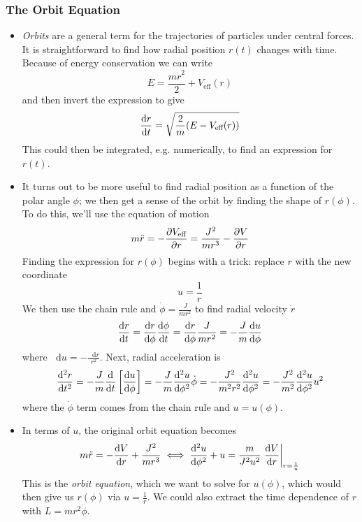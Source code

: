 \documentclass[11pt, a4paper]{article}
\newcommand{\diff}{\mathop{}\!\mathrm{d}} %
\newcommand{\veff}{V_{\text{eff}}}
\begin{document}
\subsubsection{The Orbit Equation}

\begin{itemize}
	\item \textit{Orbits} are a general term for the  trajectories of particles under central forces. It is straightforward to find how radial position $ r(t) $ changes with time. Because of energy conservation we can write
	\begin{equation*}
		E = \frac{m \dot{r}^{2}}{2} + \veff(r)
	\end{equation*}
	and then invert the expression to give
	\begin{equation*}
		\dv{r}{t} = \sqrt{\frac{2}{m}(E - \veff(r))}
	\end{equation*}
	This could then be integrated, e.g. numerically, to find an expression for $ r(t) $. 
	
	\item It turns out to be more useful to find radial position as a function of the polar angle $ \phi $; we then get a sense of the orbit by finding the shape of $ r(\phi) $. To do this, we'll use the equation of motion
	\begin{equation*}
		m \ddot{r} = -\pdv{\veff}{r} = \frac{J^{2}}{mr^{3}} - \pdv{V}{r}
	\end{equation*}
	Finding the expression for $ r(\phi) $ begins with a trick: replace $ r $ with the new coordinate
	\begin{equation*}
		u = \frac{1}{r}
	\end{equation*}
	We then use the chain rule and $ \dot{\phi} = \frac{J}{mr^{2}} $ to find radial velocity $ \dot{r} $
	\begin{equation*}
		\dv{r}{t} = \dv{r}{\phi} \dv{\phi}{t} =  \dv{r}{\phi}  \frac{J}{mr^{2}}  = - \frac{J}{m} \dv{u}{\phi}
	\end{equation*}
	where  $ \diff u = -\frac{\diff r}{r^{2}} $. Next, radial acceleration is
	\begin{equation*}
		\dv[2]{r}{t} = - \frac{J}{m} \dv{}{t}\left[\dv{u}{\phi}\right] = - \frac{J}{m} \dv[2]{u}{\phi} \dot{\phi} = -\frac{J^{2}}{m^{2}r^{2}} \dv[2]{u}{\phi} = -\frac{J^{2}}{m^{2}}\dv[2]{u}{\phi} u^{2}
	\end{equation*}
	where the $ \dot{\phi} $ term comes from the chain rule and $ u = u(\phi) $.
	
	\item In terms of $ u $, the original orbit equation becomes
	\begin{equation*}
		m \ddot{r} = - \dv{V}{r} + \frac{J^{2}}{mr^{3}} \iff \dv[2]{u}{\phi} + u = \frac{m}{J^{2}u^{2}} \eval{\dv{V}{r}}_{r = \frac{1}{u}}
	\end{equation*}
	This is the \textit{orbit equation}, which we want to solve for $ u(\phi) $, which would then give us $ r(\phi) $ via $ u = \frac{1}{r} $. We could also extract the time dependence of $ r $ with $ L = m r^{2} \dot{\phi}$.
	

\end{itemize}
\end{document}

